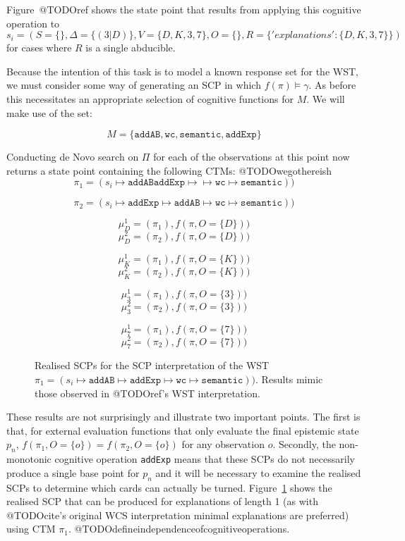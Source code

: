 Figure~@TODOref shows the state point that results from applying this cognitive operation to $s_i=(S=\{\},\Delta=\{(3|D)\},V=\{D,K,3,7\},O=\{\},R=\{'explanations':\{D,K,3,7\}\})$ for cases where $R$ is a single abducible.

Because the intention of this task is to model a known response set for the WST, we must consider some way of generating an SCP in which $f(\pi)\models \gamma$. As before this necessitates an appropriate selection of cognitive functions for $M$. We will make use of the set:

\[
M=\{\texttt{addAB},\texttt{wc},\texttt{semantic}, \texttt{addExp}\}
\]

Conducting de Novo search on $\Pi$ for each of the observations at this point now returns a state point containing the following CTMs:
@TODOwegothereish
\[
\pi_1=(s_i \longmapsto \texttt{addAB} \texttt{addExp} \longmapsto \longmapsto \texttt{wc} \longmapsto \texttt{semantic}))
\]

\[
\pi_2=(s_i \longmapsto \texttt{addExp} \longmapsto \texttt{addAB} \longmapsto \texttt{wc} \longmapsto \texttt{semantic}))
\]


\[
\mu_D^1=(\pi_1), f(\pi, O=\{D\}))
\]
\[
\mu_D^2=(\pi_2), f(\pi, O=\{D\}))
\]

\[
\mu_K^1=(\pi_1), f(\pi, O=\{K\}))
\]
\[
\mu_K^2=(\pi_2), f(\pi, O=\{K\}))
\]

\[
\mu_3^1=(\pi_1), f(\pi, O=\{3\}))
\]
\[
\mu_3^2=(\pi_2), f(\pi, O=\{3\}))
\]

\[
\mu_7^1=(\pi_1), f(\pi, O=\{7\}))
\]
\[
\mu_7^2=(\pi_2), f(\pi, O=\{7\}))
\]

\begin{figure}
\label{fig:rSCP_WST}
\caption{Realised SCPs for the SCP interpretation of the WST $\pi_1=(s_i \longmapsto \texttt{addAB} \longmapsto \texttt{addExp}  \longmapsto \texttt{wc} \longmapsto \texttt{semantic}))$. Results mimic those observed in @TODOref's WST interpretation.}
\end{figure}

These results are not surprisingly and illustrate two important points. The first is that, for external evaluation functions that only evaluate the final epistemic state $p_n$, $f(\pi_1,O=\{o\})=f(\pi_2,O=\{o\})$ for any observation $o$. Secondly, the non-monotonic cognitive operation \texttt{addExp} means that these SCPs do not necessarily produce a single base point for $p_n$ and it will be necessary to examine the realised SCPs to determine which cards can actually be turned. Figure~\ref{fig:rSCP_WST} shows the realised SCP that can be produced for explanations of length 1 (as with @TODOcite's original WCS interpretation minimal explanations are preferred) using CTM $\pi_1$. @TODOdefineindependenceofcognitiveoperations. 

